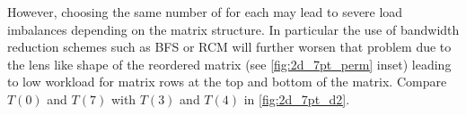 However, choosing the same number of \levels for each \levelGroup may lead to severe load imbalances depending on the matrix structure. In particular the use of bandwidth reduction schemes such as BFS or RCM  will further worsen that problem due to the lens like shape of the reordered matrix (see \cref{fig:2d_7pt_perm} inset) leading to low workload for matrix rows at the top and bottom of the matrix. Compare \eg $T(0)$ and $T(7)$ with  $T(3)$ and $T(4)$ in \cref{fig:2d_7pt_d2}.
  
